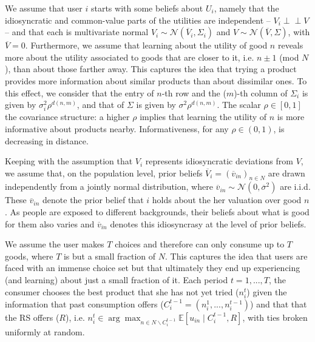 \documentclass[sigconf]{acmart}
\begin{document}
We assume that user $i$ starts with some beliefs about $U_i$, namely that the idiosyncratic and common-value parts of the utilities are independent -- $V_i \perp \!\!\! \perp V$ -- and that each is multivariate normal $V_i \sim \mathcal N (\overline V_i, \Sigma_i)$ and $V \sim \mathcal N(\overline V, \Sigma)$, with $\overline V =0$.
Furthermore, we assume that learning about the utility of good $n$ reveals more about the utility associated to goods that are closer to it, i.e. $n\pm1$ (mod $N$), than about those farther away. This captures the idea that trying a product provides more information about similar products than about dissimilar ones.
To this effect, we consider that the entry of $n$-th row and the ($m$)-th column of $\Sigma_i$ is given by $\sigma_i^2 \rho^{d(n,m)}$, and that of $\Sigma$ is given by $\sigma^2 \rho^{d(n,m)}$. The scalar $\rho \in [0,1]$ the covariance structure: a higher $\rho$ implies that learning the utility of $n$ is more informative about products nearby. Informativeness, for any $\rho \in (0,1)$, is decreasing in distance.
\par
Keeping with the assumption that $V_i$ represents idiosyncratic deviations from $V$, we assume that, on the population level, prior beliefs $\overline V_i=\left(\overline v_{in}\right)_{n \in N}$ are drawn independently from a jointly normal distribution, where $\overline v_{in} \sim \mathcal N (0, \overline \sigma^2)$ are i.i.d. These $\overline v_{in}$ denote the prior belief that $i$ holds about the her valuation over good $n$. As people are exposed to different backgrounds, their beliefs about what is good for them also varies and $\overline v_{in}$ denotes this idiosyncrasy at the level of prior beliefs. 
\par
We assume the user makes $T$ choices and therefore can only consume up to $T$ goods, where $T$ is but a small fraction of $N$. This captures the idea that users are faced with an immense choice set but that ultimately they end up experiencing (and learning) about just a small fraction of it. Each period $t=1,...,T$, the consumer chooses the best product that she has not yet tried ($n_i^t$) given the information that past consumption offers ($C_i^{t-1}=(n_i^1,...,n_i^{t-1})$) and that that the RS offers ($R$), i.e. $n_i^t \in \arg \max_{ n \in N \backslash C_i^{t-1}} \mathbb E \left[u_{in} \mid C_i^{t-1}, R\right]$, with ties broken uniformly at random. 
\par
\end{document}

